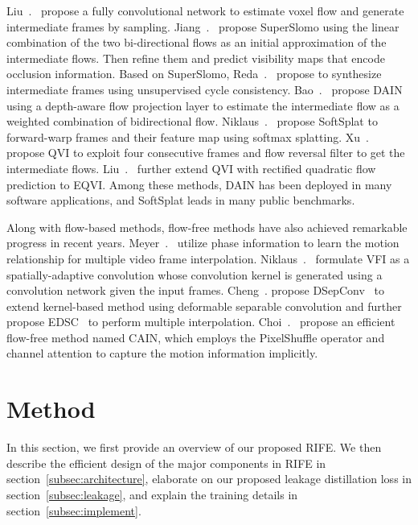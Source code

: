 \documentclass[10pt,twocolumn,letterpaper]{article}
\begin{document}
Liu~\etal.~\cite{liu2017video} propose a fully convolutional network to estimate voxel flow and generate intermediate frames by sampling. Jiang~\etal.~\cite{jiang2018super} propose SuperSlomo using the linear combination of the two bi-directional flows as an initial approximation of the intermediate flows. Then refine them and predict visibility maps that encode occlusion information. Based on SuperSlomo, Reda~\etal.~\cite{reda2019unsupervised} propose to synthesize intermediate frames using unsupervised cycle
consistency. Bao~\etal.~\cite{bao2019depth} propose DAIN using a depth-aware flow projection layer to estimate the intermediate flow as a weighted combination of bidirectional flow. Niklaus~\etal.~\cite{niklaus2020softmax} propose SoftSplat to forward-warp frames and their feature map using softmax splatting. Xu~\etal.~\cite{xu2019quadratic} propose QVI to exploit four consecutive frames and flow reversal filter to get the intermediate flows. Liu~\etal.~\cite{liu2020enhanced} further extend QVI with rectified quadratic flow prediction to EQVI. Among these methods, DAIN has been deployed in many software applications, and SoftSplat leads in many public benchmarks.

Along with flow-based methods, flow-free methods have also achieved remarkable progress in recent years. Meyer~\etal.~\cite{meyer2015phase} utilize phase information to learn the motion relationship for multiple video frame interpolation. Niklaus~\etal.~\cite{niklaus2017video, Niklaus_ICCV_2017} formulate VFI as a spatially-adaptive convolution whose convolution kernel is generated using a convolution network given the input frames. Cheng~\etal. propose DSepConv~\cite{cheng2020video} to extend kernel-based method using deformable separable convolution and further propose EDSC~\cite{cheng2020multiple} to perform multiple interpolation. Choi~\etal.~\cite{choi2020channel} propose an efficient flow-free method named CAIN, which employs the PixelShuffle operator and channel attention to capture the motion information implicitly. 

%
 	\section{Method}

In this section, we first provide an overview of our proposed RIFE. We then describe the efficient design of the major components in RIFE in section~\ref{subsec:architecture}, elaborate on our proposed leakage distillation loss in section~\ref{subsec:leakage}, and explain the training details in section~\ref{subsec:implement}. 
\end{document}

